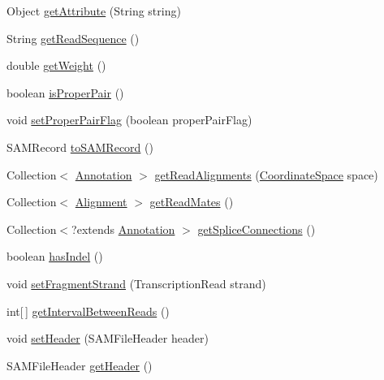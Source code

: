 \begin{DoxyCompactItemize}
Object \hyperlink{interfaceumms_1_1core_1_1alignment_1_1_alignment_ae8f96c807f69c9e0d48077998f9f338f}{get\+Attribute} (String string)
\item 
String \hyperlink{interfaceumms_1_1core_1_1alignment_1_1_alignment_a35e95edade9121503e38f1e5a82dbfd6}{get\+Read\+Sequence} ()
\item 
double \hyperlink{interfaceumms_1_1core_1_1alignment_1_1_alignment_adc1158b384c343f66a3cccfee951b293}{get\+Weight} ()
\item 
boolean \hyperlink{interfaceumms_1_1core_1_1alignment_1_1_alignment_a0cfc2e0a3ee1e18b1a103d600e29bba0}{is\+Proper\+Pair} ()
\item 
void \hyperlink{interfaceumms_1_1core_1_1alignment_1_1_alignment_ac7f14cb2660aaabeac51f6b75f1ce164}{set\+Proper\+Pair\+Flag} (boolean proper\+Pair\+Flag)
\item 
S\+A\+M\+Record \hyperlink{interfaceumms_1_1core_1_1alignment_1_1_alignment_a12fec354239ea85143cc500cefceaaf1}{to\+S\+A\+M\+Record} ()
\item 
Collection$<$ \hyperlink{interfaceumms_1_1core_1_1annotation_1_1_annotation}{Annotation} $>$ \hyperlink{interfaceumms_1_1core_1_1alignment_1_1_alignment_a563a8db2ae65cace4f3192798de6b542}{get\+Read\+Alignments} (\hyperlink{interfaceumms_1_1core_1_1coordinatesystem_1_1_coordinate_space}{Coordinate\+Space} space)
\item 
Collection$<$ \hyperlink{interfaceumms_1_1core_1_1alignment_1_1_alignment}{Alignment} $>$ \hyperlink{interfaceumms_1_1core_1_1alignment_1_1_alignment_a727bd0d8dbdf53adc79c290dcefb860c}{get\+Read\+Mates} ()
\item 
Collection$<$?extends \hyperlink{interfaceumms_1_1core_1_1annotation_1_1_annotation}{Annotation} $>$ \hyperlink{interfaceumms_1_1core_1_1alignment_1_1_alignment_a559c79b4aa45eeec28c95d5336dc096e}{get\+Splice\+Connections} ()
\item 
boolean \hyperlink{interfaceumms_1_1core_1_1alignment_1_1_alignment_a25161c9ab59abb1f24ba996606ec4974}{has\+Indel} ()
\item 
void \hyperlink{interfaceumms_1_1core_1_1alignment_1_1_alignment_afd4d444c8d0fffc880aff18481cd39ff}{set\+Fragment\+Strand} (Transcription\+Read strand)
\item 
int\mbox{[}$\,$\mbox{]} \hyperlink{interfaceumms_1_1core_1_1alignment_1_1_alignment_a8cf9661b7c5fb24a23d5ec2edff6009f}{get\+Interval\+Between\+Reads} ()
\item 
void \hyperlink{interfaceumms_1_1core_1_1alignment_1_1_alignment_a4305d2988fba3c16803f3e999b58a200}{set\+Header} (S\+A\+M\+File\+Header header)
\item 
S\+A\+M\+File\+Header \hyperlink{interfaceumms_1_1core_1_1alignment_1_1_alignment_a1535cacbe7e0b688eecfce4ea9490c2c}{get\+Header} ()
\end{DoxyCompactItemize}


